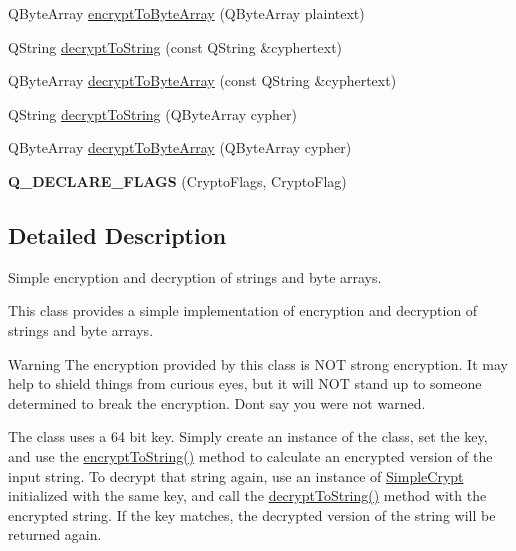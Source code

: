 \begin{DoxyCompactItemize}
\item 
Q\+Byte\+Array \mbox{\hyperlink{class_simple_crypt_a741305d04e86bcb7d4625b05bf234887}{encrypt\+To\+Byte\+Array}} (Q\+Byte\+Array plaintext)
\item 
Q\+String \mbox{\hyperlink{class_simple_crypt_aa454cf372b534fd5ffaa2c5bd0fa57ea}{decrypt\+To\+String}} (const Q\+String \&cyphertext)
\item 
Q\+Byte\+Array \mbox{\hyperlink{class_simple_crypt_ad6785e087d449a1aa80c39248e98fcda}{decrypt\+To\+Byte\+Array}} (const Q\+String \&cyphertext)
\item 
Q\+String \mbox{\hyperlink{class_simple_crypt_ad1a3257cefee43773803ec1b12654f92}{decrypt\+To\+String}} (Q\+Byte\+Array cypher)
\item 
Q\+Byte\+Array \mbox{\hyperlink{class_simple_crypt_a4babb69e45849f672574a26b6433c85a}{decrypt\+To\+Byte\+Array}} (Q\+Byte\+Array cypher)
\item 
\mbox{\label{class_simple_crypt_a710fb3871372ccddd6450f73afca24eb}} 
{\bfseries Q\+\_\+\+D\+E\+C\+L\+A\+R\+E\+\_\+\+F\+L\+A\+GS} (Crypto\+Flags, Crypto\+Flag)
\end{DoxyCompactItemize}


\subsection{Detailed Description}
Simple encryption and decryption of strings and byte arrays. 

This class provides a simple implementation of encryption and decryption of strings and byte arrays.

\begin{DoxyWarning}{Warning}
The encryption provided by this class is N\+OT strong encryption. It may help to shield things from curious eyes, but it will N\+OT stand up to someone determined to break the encryption. Don\textquotesingle{}t say you were not warned.
\end{DoxyWarning}
The class uses a 64 bit key. Simply create an instance of the class, set the key, and use the \mbox{\hyperlink{class_simple_crypt_af26a3d3c6cef9732190c1d2c6a53a5b5}{encrypt\+To\+String()}} method to calculate an encrypted version of the input string. To decrypt that string again, use an instance of \mbox{\hyperlink{class_simple_crypt}{Simple\+Crypt}} initialized with the same key, and call the \mbox{\hyperlink{class_simple_crypt_aa454cf372b534fd5ffaa2c5bd0fa57ea}{decrypt\+To\+String()}} method with the encrypted string. If the key matches, the decrypted version of the string will be returned again.

